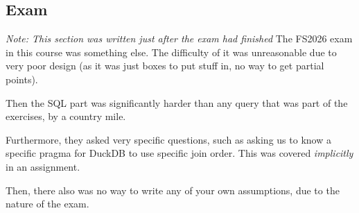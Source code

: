 \subsection{Exam}
{\scriptsize \textit{Note: This section was written just after the exam had finished}}
The FS2026 exam in this course was something else. The difficulty of it was unreasonable due to very poor design (as it was just boxes to put stuff in, no way to get partial points).

Then the SQL part was significantly harder than any query that was part of the exercises, by a country mile.

Furthermore, they asked very specific questions, such as asking us to know a specific pragma for DuckDB to use specific join order.
This was covered \textit{implicitly} in an assignment.

Then, there also was no way to write any of your own assumptions, due to the nature of the exam.
